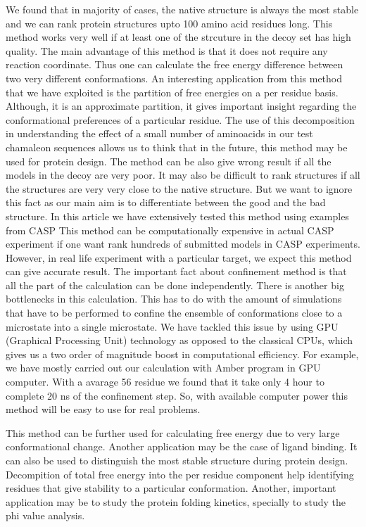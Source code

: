 \documentclass[12pt]{article}
\begin{document}
We found that in majority of cases, the native structure is always the most stable and we can rank
protein structures upto 100 amino acid residues long. This method works very well if at least one of
the strcuture in the decoy set has high quality. The main advantage of this method is that it does
not require any reaction coordinate. Thus one can calculate the free energy difference between two
very different conformations. An interesting application from this method that we have exploited is
the partition of free energies on a per residue basis. Although, it is an approximate partition, it
gives important insight regarding the conformational preferences of a particular residue. The use of
this decomposition in understanding the effect of a small number of aminoacids in our test chamaleon
sequences allows us to think that in the future, this method may be used for protein design. The
method can be also give wrong result if all the models in the decoy are very poor. It may also be
difficult to rank structures if all the structures are very very close to the native structure. But
we want to ignore this fact as our main aim is to differentiate between the good and the bad
structure. In this article we have extensively tested this method using examples from CASP This
method can be computationally expensive in actual CASP experiment if one want rank hundreds of
submitted models in CASP experiments. However, in real life experiment with a particular target, we
expect this method can give accurate result. The important fact about confinement method is that all
the part of the calculation can be done independently. There is another big bottlenecks in this
calculation. This has to do with the amount of simulations that have to be performed to confine the
ensemble of conformations close to a microstate into a single microstate. We have tackled this issue
by using GPU (Graphical Processing Unit) technology as opposed to the classical CPUs, which gives us
a two order of magnitude boost in computational efficiency. For example, we have mostly carried out
our calculation with Amber program \cite{Case2005} in GPU computer. With a avarage 56 residue we
found that it take only 4 hour to complete 20 ns of the confinement step. So, with available
computer power this method will be easy to use for real problems.

This method can be further used for calculating free energy due to very large conformational change.
Another application may be the case of ligand binding. It can also be used to distinguish the most
stable structure during protein design. Decompition of total free energy into the per residue
component help identifying residues that give stability to a particular conformation. Another,
important application may be to study the protein folding kinetics, specially to study the phi value
analysis.
\end{document}
